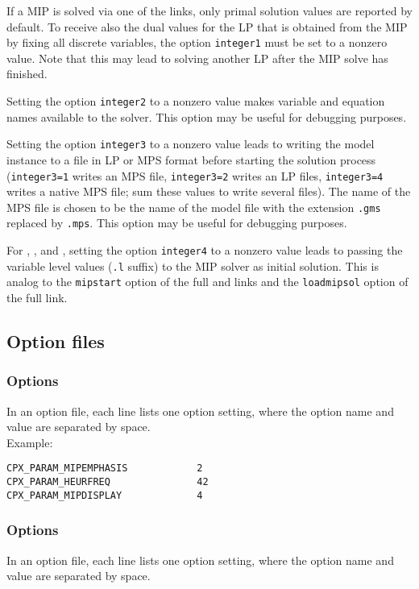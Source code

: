 If a MIP is solved via one of the \OSI links, only primal solution values are reported by default.
To receive also the dual values for the LP that is obtained from the MIP by fixing all discrete variables, the \GAMS option \texttt{integer1} must be set to a nonzero value. Note that this may lead to solving another LP after the MIP solve has finished.

Setting the \GAMS option \texttt{integer2} to a nonzero value makes variable and equation names available to the solver.
This option may be useful for debugging purposes.

Setting the \GAMS option \texttt{integer3} to a nonzero value leads to writing the model instance to a file in LP or MPS format before starting the solution process (\texttt{integer3=1} writes an MPS file, \texttt{integer3=2} writes an LP files, \texttt{integer3=4} writes a native MPS file; sum these values to write several files).
The name of the MPS file is chosen to be the name of the \GAMS model file with the extension \texttt{.gms} replaced by \texttt{.mps}.
This option may be useful for debugging purposes.

For \OSICPLEX, \OSIGUROBI, and \OSIXPRESS, setting the \GAMS option \texttt{integer4} to a nonzero value leads to passing the variable level values (\texttt{.l} suffix) to the MIP solver as initial solution. This is analog to the \texttt{mipstart} option of the full \CPLEX and \GUROBI links and the \texttt{loadmipsol} option of the full \XPRESS link.

\subsection{Option files}
\label{sub:osioptions}

\subsubsection{\OSICPLEX Options}
In an \OSICPLEX option file, each line lists one option setting, where the option name and value are separated by space.\\
Example:
\begin{verbatim}
CPX_PARAM_MIPEMPHASIS            2
CPX_PARAM_HEURFREQ               42
CPX_PARAM_MIPDISPLAY             4
\end{verbatim}

\subsubsection{\OSIGUROBI Options}
In an \OSICPLEX option file, each line lists one option setting, where the option name and value are separated by space.

